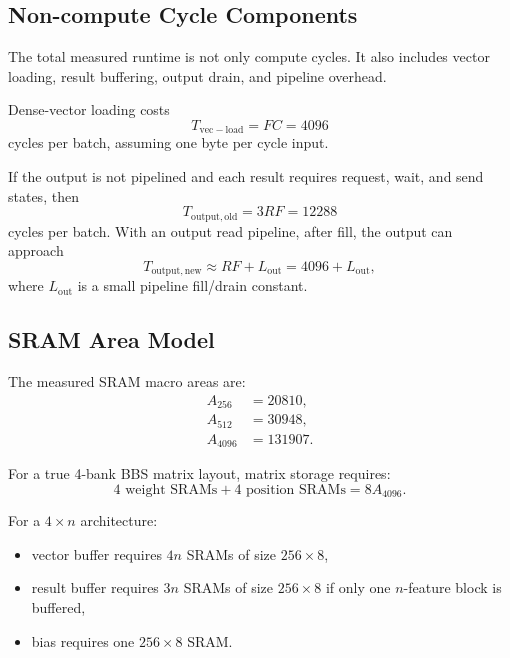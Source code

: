 \documentclass[11pt,a4paper]{article}
\begin{document}
\subsection{Non-compute Cycle Components}

The total measured runtime is not only compute cycles. It also includes vector loading, result buffering, output drain, and pipeline overhead.

Dense-vector loading costs
\begin{equation}
    T_{\mathrm{vec-load}} = F C = 4096
\end{equation}
cycles per batch, assuming one byte per cycle input.

If the output is not pipelined and each result requires request, wait, and send states, then
\begin{equation}
    T_{\mathrm{output,old}} = 3 R F = 12288
\end{equation}
cycles per batch. With an output read pipeline, after fill, the output can approach
\begin{equation}
    T_{\mathrm{output,new}} \approx R F + L_{\mathrm{out}} = 4096 + L_{\mathrm{out}},
\end{equation}
where $L_{\mathrm{out}}$ is a small pipeline fill/drain constant.

\subsection{SRAM Area Model}

The measured SRAM macro areas are:
\begin{align*}
    A_{256}  &= 20810,\\
    A_{512}  &= 30948,\\
    A_{4096} &= 131907.
\end{align*}

For a true 4-bank BBS matrix layout, matrix storage requires:
\begin{equation}
    4 \text{ weight SRAMs} + 4 \text{ position SRAMs} = 8 A_{4096}.
\end{equation}

For a $4 \times n$ architecture:
\begin{itemize}[nosep]
    \item vector buffer requires $4n$ SRAMs of size $256 \times 8$,
    \item result buffer requires $3n$ SRAMs of size $256 \times 8$ if only one $n$-feature block is buffered,
    \item bias requires one $256 \times 8$ SRAM.
\end{itemize}
\end{document}
